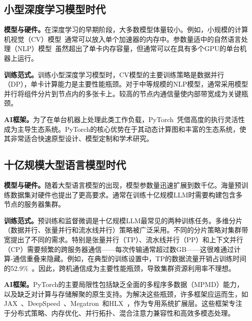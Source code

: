 \documentclass[11pt]{article}
\begin{document}
\subsection{小型深度学习模型时代}

\textbf{模型与硬件。}在深度学习的早期阶段，大多数模型体量较小。例如，小规模的计算机视觉（CV）模型~\cite{zhao2024review}通常可以放入单个加速器的内存中。参数量适中的自然语言处理（NLP）模型~\cite{liu2019roberta}虽然超出了单卡内存容量，但通常可以在具有多个GPU的单台机器上运行。

\noindent \textbf{训练范式。}训练小型深度学习模型时，CV模型的主要训练策略是数据并行（DP），单卡计算能力是主要性能瓶颈。对于中等规模的NLP模型，通常采用模型并行将组件分片到节点内的多张卡上。较高的节点内通信量使内部带宽成为关键瓶颈。

\noindent \textbf{AI框架。}为了在单台机器上处理此类工作负载，PyTorch~\cite{paszke2019pytorch}凭借高度的执行灵活性成为主导生态系统。PyTorch的核心优势在于其动态计算图和丰富的生态系统，使其非常适合快速原型设计、模型定制和学术研究。

\subsection{十亿规模大型语言模型时代}

\noindent \textbf{模型与硬件。}随着大型语言模型的出现，模型参数量迅速扩展到数千亿。海量预训练数据集对硬件也提出了更高要求。通常在训练十亿规模LLM时需要构建包含多节点的服务器集群。

\noindent \textbf{训练范式。}预训练和监督微调是十亿规模LLM最常见的两种训练任务。多维分片（数据并行、张量并行和流水线并行）策略被广泛采用。不同的分片策略对集群带宽提出了不同的需求。特别是张量并行（TP）、流水线并行（PP）和上下文并行（CP）需要频繁的跨服务器通信——每次传输通常超过数GB——这很难通过计算-通信重叠来隐藏。例如，在典型的训练设置中，TP的数据流量开销占训练时间的52.9\%~\cite{ubmesh}。因此，跨机通信成为主要性能瓶颈，导致集群资源利用率不理想。

\noindent \textbf{AI框架。}PyTorch的主要局限性包括缺乏全面的多程序多数据（MPMD）能力，以及缺乏对计算与存储解聚的原生支持。为解决这些瓶颈，许多框架应运而生，如JAX~\cite{jax2018github}、DeepSpeed~\cite{rasley2020deepspeed}、Megatron~\cite{shoeybi2019megatron}和HLX~\cite{jung2025hlx}，作为专用系统扩展层。这些框架专注于分布式策略、内存优化、并行拓扑、混合注意力兼容性和高效多模态处理。
\end{document}
